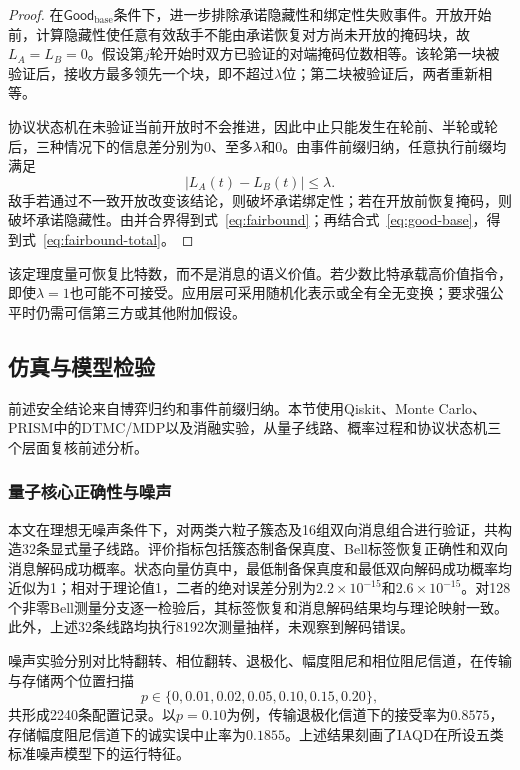 \documentclass[UTF8,10pt,a4paper]{ctexart}
\theoremstyle{aqdplain}
\begin{document}
\begin{proof}
在$\mathsf{Good}_{\mathrm{base}}$条件下，进一步排除承诺隐藏性和绑定性失败事件。开放开始前，计算隐藏性使任意有效敌手不能由承诺恢复对方尚未开放的掩码块，故$L_A=L_B=0$。假设第$j$轮开始时双方已验证的对端掩码位数相等。该轮第一块被验证后，接收方最多领先一个块，即不超过$\lambda$位；第二块被验证后，两者重新相等。

协议状态机在未验证当前开放时不会推进，因此中止只能发生在轮前、半轮或轮后，三种情况下的信息差分别为$0$、至多$\lambda$和$0$。由事件前缀归纳，任意执行前缀均满足
\[
|L_A(t)-L_B(t)|\leq\lambda.
\]
敌手若通过不一致开放改变该结论，则破坏承诺绑定性；若在开放前恢复掩码，则破坏承诺隐藏性。由并合界得到式~\eqref{eq:fairbound}；再结合式~\eqref{eq:good-base}，得到式~\eqref{eq:fairbound-total}。
\end{proof}

该定理度量可恢复比特数，而不是消息的语义价值。若少数比特承载高价值指令，即使$\lambda=1$也可能不可接受。应用层可采用随机化表示或全有全无变换；要求强公平时仍需可信第三方或其他附加假设。

\subsection{仿真与模型检验}

前述安全结论来自博弈归约和事件前缀归纳。本节使用Qiskit\citep{qiskit2024}、Monte Carlo、PRISM\citep{prism2011}中的DTMC/MDP以及消融实验，从量子线路、概率过程和协议状态机三个层面复核前述分析。

\subsubsection{量子核心正确性与噪声}

本文在理想无噪声条件下，对两类六粒子簇态及16组双向消息组合进行验证，共构造32条显式量子线路。评价指标包括簇态制备保真度、Bell标签恢复正确性和双向消息解码成功概率。状态向量仿真中，最低制备保真度和最低双向解码成功概率均近似为1；相对于理论值1，二者的绝对误差分别为$2.2\times10^{-15}$和$2.6\times10^{-15}$。对128个非零Bell测量分支逐一检验后，其标签恢复和消息解码结果均与理论映射一致。此外，上述32条线路均执行8192次测量抽样，未观察到解码错误。

噪声实验分别对比特翻转、相位翻转、退极化、幅度阻尼和相位阻尼信道，在传输与存储两个位置扫描
\[
p\in\{0,0.01,0.02,0.05,0.10,0.15,0.20\},
\]
共形成2240条配置记录。以$p=0.10$为例，传输退极化信道下的接受率为$0.8575$，存储幅度阻尼信道下的诚实误中止率为$0.1855$。上述结果刻画了IAQD在所设五类标准噪声模型下的运行特征。
\end{document}
